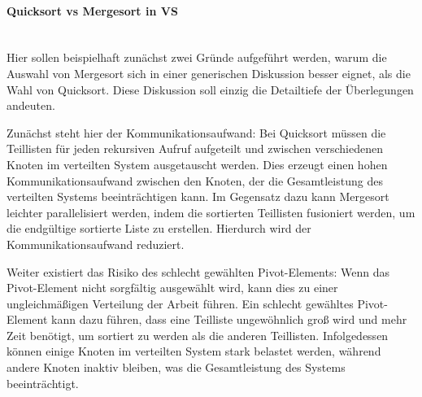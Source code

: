 \documentclass[../vs-script-first-v01.tex]{subfiles}
\begin{document}
\begin{itemize}
{        \paragraph{Quicksort vs Mergesort in VS}\mbox{}\\
        Hier sollen beispielhaft zunächst zwei Gründe aufgeführt werden, warum die Auswahl von Mergesort sich in einer generischen Diskussion besser eignet, als die Wahl von Quicksort. Diese Diskussion soll einzig die Detailtiefe der Überlegungen andeuten.

        Zunächst steht hier der Kommunikationsaufwand: Bei Quicksort müssen die Teillisten für jeden rekursiven Aufruf aufgeteilt und zwischen verschiedenen Knoten im verteilten System ausgetauscht werden. Dies erzeugt einen hohen Kommunikationsaufwand zwischen den Knoten, der die Gesamtleistung des verteilten Systems beeinträchtigen kann. Im Gegensatz dazu kann Mergesort leichter parallelisiert werden, indem die sortierten Teillisten fusioniert werden, um die endgültige sortierte Liste zu erstellen. Hierdurch wird der Kommunikationsaufwand reduziert.

        Weiter existiert das Risiko des schlecht gewählten Pivot-Elements:
        Wenn das Pivot-Element nicht sorgfältig ausgewählt wird, kann dies zu einer ungleichmäßigen Verteilung der Arbeit führen. Ein schlecht gewähltes Pivot-Element kann dazu führen, dass eine Teilliste ungewöhnlich groß wird und mehr Zeit benötigt, um sortiert zu werden als die anderen Teillisten. Infolgedessen können einige Knoten im verteilten System stark belastet werden, während andere Knoten inaktiv bleiben, was die Gesamtleistung des Systems beeinträchtigt.

}
\end{itemize}
\end{document}
